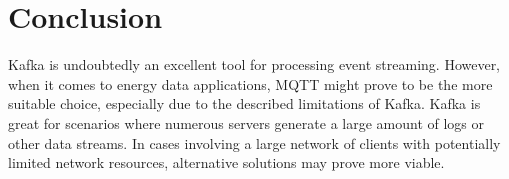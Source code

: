 \section{Conclusion}
\label{cha:conclusion}

Kafka is undoubtedly an excellent tool for processing event streaming. However, when it comes to energy data applications, MQTT might prove to be the more suitable choice, especially due to the described limitations of Kafka. Kafka is great for scenarios where numerous servers generate a large amount of logs or other data streams. In cases involving a large network of clients with potentially limited network resources, alternative solutions may prove more viable.